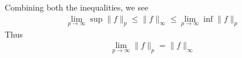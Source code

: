 \documentclass[12pt]{exam}
\theoremstyle{plain} %
\theoremstyle{definition} %
\theoremstyle{remark} %
\begin{document}
\begin{questions}
\begin{solution}
\begin{parts}
      Combining both the inequalities, we see
      \begin{align*}
        \lim_{p \to \infty} \sup \|f\|_p \le \|f\|_\infty \le \lim_{p
        \to \infty} \inf \|f\|_p
      \end{align*}
      Thus
      \begin{align*}
        \lim_{p \to \infty} \|f\|_p = \|f\|_\infty
      \end{align*}
    \end{parts}

  \end{solution}

\end{questions}
\printbibliography[heading=bibintoc]
\end{document}
